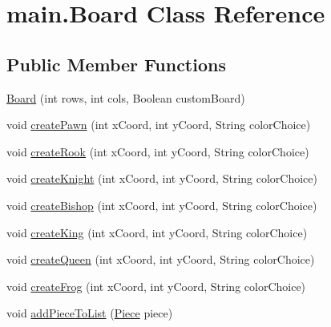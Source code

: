 \hypertarget{classmain_1_1_board}{}\section{main.\+Board Class Reference}
\label{classmain_1_1_board}
\subsection*{Public Member Functions}
\begin{DoxyCompactItemize}
\item 
\hyperlink{classmain_1_1_board_a8121213fe895c9aef3b825f9981ab014}{Board} (int rows, int cols, Boolean custom\+Board)
\item 
void \hyperlink{classmain_1_1_board_a433581909511ffb611818397c0d3d59b}{create\+Pawn} (int x\+Coord, int y\+Coord, String color\+Choice)
\item 
void \hyperlink{classmain_1_1_board_a1d50738826f5552a1a40b587fb347e19}{create\+Rook} (int x\+Coord, int y\+Coord, String color\+Choice)
\item 
void \hyperlink{classmain_1_1_board_a3196684b770b7999e374da1b55118094}{create\+Knight} (int x\+Coord, int y\+Coord, String color\+Choice)
\item 
void \hyperlink{classmain_1_1_board_a483033056ca4afb113cac5f4ced359fb}{create\+Bishop} (int x\+Coord, int y\+Coord, String color\+Choice)
\item 
void \hyperlink{classmain_1_1_board_a1d2ea2f8563f577b2f0fabcf855738c1}{create\+King} (int x\+Coord, int y\+Coord, String color\+Choice)
\item 
void \hyperlink{classmain_1_1_board_aa0957c5b4653c450307263bc89fa1bba}{create\+Queen} (int x\+Coord, int y\+Coord, String color\+Choice)
\item 
void \hyperlink{classmain_1_1_board_a10f8b1925189e9c3e818f3555d7ebd39}{create\+Frog} (int x\+Coord, int y\+Coord, String color\+Choice)
\item 
void \hyperlink{classmain_1_1_board_acb48e8218e61ff5504a195bb8634e2d4}{add\+Piece\+To\+List} (\hyperlink{classmain_1_1pieces_1_1_piece}{Piece} piece)
\end{DoxyCompactItemize}
